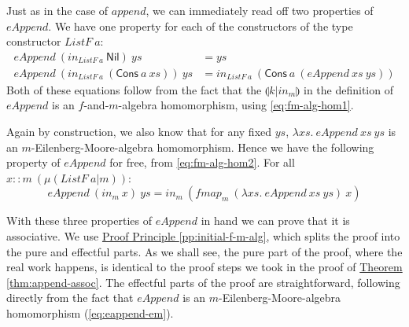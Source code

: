 \documentclass{jfp1}
\newcommand{\eFold}[2]{\llparenthesis #1|#2 \rrparenthesis}
\newcommand{\proofprinref}[1]{\hyperref[#1]{Proof Principle \ref*{#1}}}
\newcommand{\thmref}[1]{\hyperref[#1]{Theorem \ref*{#1}}}
\begin{document}
Just as in the case of $\mathit{append}$, we can immediately read off
two properties of $\mathit{eAppend}$. We have one property for each of
the constructors of the type constructor $\mathit{ListF}~a$:
\begin{align}
  \label{eq:eAppend-nil}
  \mathit{eAppend}~(\mathit{in}_{\mathit{ListF}~a}~\mathsf{Nil})~\mathit{ys} & = \mathit{ys} \\
  \label{eq:eAppend-cons}
  \mathit{eAppend}~(\mathit{in}_{\mathit{ListF}~a}~(\mathsf{Cons}~a~\mathit{xs}))~\mathit{ys} & = \mathit{in}_{\mathit{ListF}~a}~(\mathsf{Cons}~a~(\mathit{eAppend}~\mathit{xs}~\mathit{ys}))
\end{align}
Both of these equations follow from the fact that the
$\eFold{k}{\mathit{in}_m}$ in the definition of $\mathit{eAppend}$ is
an $f$-and-$m$-algebra homomorphism, using \autoref{eq:fm-alg-hom1}.

Again by construction, we also know that for any fixed $\mathit{ys}$,
$\lambda \mathit{xs}.~\mathit{eAppend}~\mathit{xs}~\mathit{ys}$ is an
$m$-Eilenberg-Moore-algebra homomorphism. Hence we have the following
property of $\mathit{eAppend}$ for free, from
\autoref{eq:fm-alg-hom2}. For all $x :: m~(\mu(\mathit{ListF}~a|m))$:
\begin{equation}\label{eq:eappend-em}
  \mathit{eAppend}~(\mathit{in}_m~\mathit{x})~\mathit{ys} = \mathit{in}_m~(\mathit{fmap}_m~(\lambda \mathit{xs}.~\mathit{eAppend}~\mathit{xs}~\mathit{ys})~\mathit{x})
\end{equation}

With these three properties of $\mathit{eAppend}$ in hand we can prove
that it is associative. We use \proofprinref{pp:initial-f-m-alg},
which splits the proof into the pure and effectful parts. As we shall
see, the pure part of the proof, where the real work happens, is
identical to the proof steps we took in the proof of
\thmref{thm:append-assoc}. The effectful parts of the proof are
straightforward, following directly from the fact that
$\mathit{eAppend}$ is an $m$-Eilenberg-Moore-algebra homomorphism
(\autoref{eq:eappend-em}).
\end{document}
